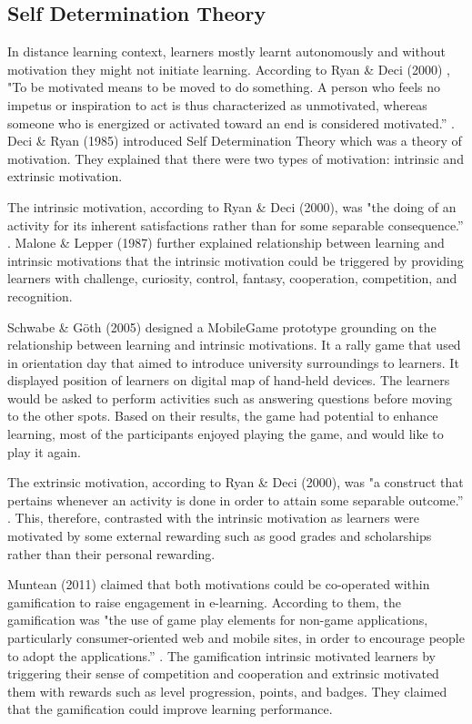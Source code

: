 \subsection{Self Determination Theory}

In distance learning context, learners mostly learnt autonomously and without motivation they might not initiate learning. According to Ryan \& Deci (2000) \cite{ryan2000intrinsic}, "To be motivated means to be moved to do something. A person who feels no impetus or inspiration to act is thus characterized as unmotivated, whereas someone who is energized or activated toward an end is considered motivated.'' \cite [pp. 54] {ryan2000intrinsic}. Deci \& Ryan (1985) introduced Self Determination Theory which was a theory of motivation. They explained that there were two types of motivation: intrinsic and extrinsic motivation. 

The intrinsic motivation, according to Ryan \& Deci (2000), was "the doing of an activity for its inherent satisfactions rather than for some separable consequence.'' \cite [pp. 56] {ryan2000intrinsic}. Malone \& Lepper (1987) further explained \cite{malone1987making} relationship between learning and intrinsic motivations that the intrinsic motivation could be triggered by providing learners with challenge, curiosity, control, fantasy, cooperation, competition, and recognition. 

Schwabe \& G{\"o}th (2005) \cite{schwabe2005mobile} designed a MobileGame prototype grounding on the relationship between learning and intrinsic motivations. It a rally game that used in orientation day that aimed to introduce university surroundings to learners. It displayed position of learners on digital map of hand-held devices. The learners would be asked to perform activities such as answering questions before moving to the other spots. Based on their results, the game had potential to enhance learning, most of the participants enjoyed playing the game, and would like to play it again. 

The extrinsic motivation, according to Ryan \& Deci (2000), was "a construct that pertains whenever an activity is done in order to attain some separable outcome.'' \cite [pp. 60] {ryan2000intrinsic}. This, therefore, contrasted with the intrinsic motivation as learners were motivated by some external rewarding such as good grades and scholarships rather than their personal rewarding. 


Muntean (2011) \cite{muntean2011raising} claimed that both motivations could be co-operated within gamification to raise engagement in e-learning. According to them, the gamification was "the use of game play elements for non-game applications, particularly consumer-oriented web and mobile sites, in order to encourage people to adopt the applications.'' \cite [pp.325]{muntean2011raising}. The gamification intrinsic motivated learners by triggering their sense of competition and cooperation  and extrinsic motivated them with rewards such as level progression, points, and badges. They claimed that the gamification could improve learning performance. 

